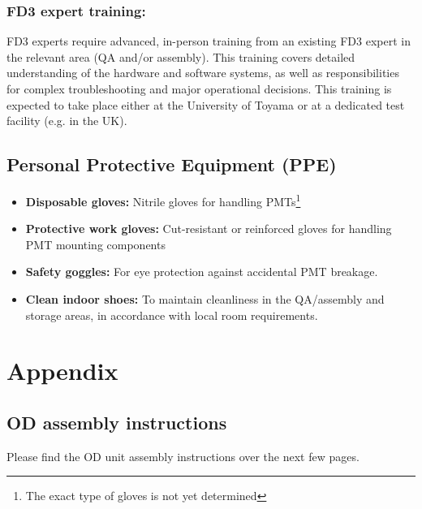 \documentclass[12pt,a4paper]{article}
\begin{document}
\subsubsection*{FD3 expert training:}
FD3 experts require advanced, in-person training from an existing FD3 expert in the relevant area (QA and/or assembly). This training covers detailed understanding of the hardware and software systems, as well as responsibilities for complex troubleshooting and major operational decisions. This training is expected to take place either at the University of Toyama or at a dedicated test facility (e.g. in the UK). 


\subsection{Personal Protective Equipment (PPE)}
\begin{itemize}
    \item \textbf{Disposable gloves:} Nitrile gloves for handling PMTs\footnote{The exact type of gloves is not yet determined}
    \item \textbf{Protective work gloves:} Cut-resistant or reinforced gloves for handling PMT mounting components
    \item \textbf{Safety goggles:} For eye protection against accidental PMT breakage.
    \item \textbf{Clean indoor shoes:} To maintain cleanliness in the QA/assembly and storage areas, in accordance with local room requirements.
\end{itemize}




\newpage
\appendix
\section{Appendix}
\subsection{OD assembly instructions} \label{app:instructions}

Please find the OD unit assembly instructions over the next few pages.
\end{document}
